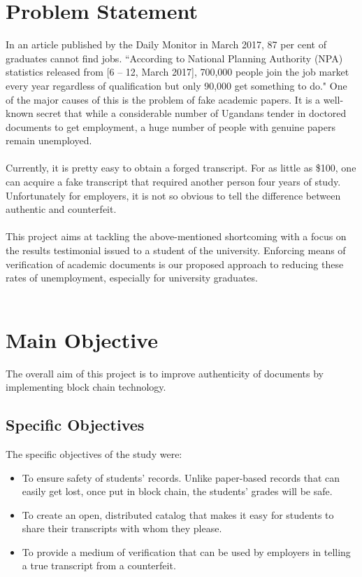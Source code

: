 \section{Problem Statement}
In an article published by the Daily Monitor in March 2017, 87 per cent of graduates cannot find jobs. ``According to National Planning Authority (NPA) statistics released from [6 – 12, March 2017], 700,000 people join the job market every year regardless of qualification but only 90,000 get something to do."\cite{art3} 
One of the major causes of this is the problem of fake academic papers. It is a well-known secret that while a considerable number of Ugandans tender in doctored documents to get employment, a huge number of people with
genuine papers remain unemployed.\\\\
Currently, it is pretty easy to obtain a forged transcript. For as little as \$100, one can acquire a fake transcript that required another person four years of study. Unfortunately for employers, it is not so obvious to tell the difference between authentic and counterfeit.\\\\
This project aims at tackling the above-mentioned shortcoming with a focus on the results testimonial issued to a student of the university. Enforcing means of verification of academic documents is our proposed approach to reducing these rates of unemployment, especially for university graduates.\\\\

\section{Main Objective}
The overall aim of this project is to improve authenticity of documents by implementing block chain technology.
\subsection{Specific Objectives}
The specific objectives of the study were: 
\begin{itemize}
\item To ensure safety of students' records. Unlike paper-based records that can easily get lost, once put in block chain, the students' grades will be safe.
\item To create an open, distributed catalog that makes it easy for students to share their transcripts with whom they please.
\item To provide a medium of verification that can be used by employers in telling a true transcript from a counterfeit.
\end{itemize}
